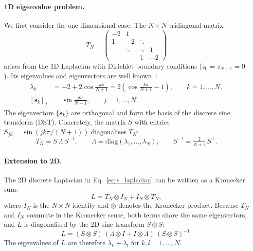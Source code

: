 \documentclass[10pt,a4paper]{article}
\begin{document}
\paragraph{1D eigenvalue problem.}
We first consider the one-dimensional case. The $N \times N$ tridiagonal matrix
\begin{equation}
  T_N =
  \begin{pmatrix}
    -2 &  1 &        &    \\
     1 & -2 & \ddots &    \\
       & \ddots & \ddots & 1 \\
       &        &  1     & -2
  \end{pmatrix}
  \label{eq:s_tridiag}
\end{equation}
arises from the 1D Laplacian with Dirichlet boundary conditions ($z_0 = z_{N+1} = 0$). Its eigenvalues and eigenvectors are well known~\cite{strang2007cse}:
\begin{align}
  \lambda_k &= -2 + 2\cos\frac{k\pi}{N+1} = 2\left(\cos\frac{k\pi}{N+1} - 1\right), \qquad k = 1,\ldots,N,
  \label{eq:s_eigenval}\\[4pt]
  [\mathbf{s}_k]_j &= \sin\frac{jk\pi}{N+1}, \qquad j = 1,\ldots,N.
  \label{eq:s_eigenvec}
\end{align}
The eigenvectors $\{\mathbf{s}_k\}$ are orthogonal and form the basis of the discrete sine transform (DST). Concretely, the matrix $S$ with entries $S_{jk} = \sin(jk\pi/(N{+}1))$ diagonalises $T_N$:
\begin{equation}
  T_N = S \,\Lambda\, S^{-1}, \qquad \Lambda = \mathrm{diag}(\lambda_1,\ldots,\lambda_N), \qquad S^{-1} = \tfrac{2}{N+1}\,S^\top.
  \label{eq:s_diag}
\end{equation}

\paragraph{Extension to 2D.}
The 2D discrete Laplacian in Eq.~\eqref{eq:s_laplacian} can be written as a Kronecker sum:
\begin{equation}
  L = T_N \otimes I_N + I_N \otimes T_N,
  \label{eq:s_kronecker}
\end{equation}
where $I_N$ is the $N \times N$ identity and $\otimes$ denotes the Kronecker product. Because $T_N$ and $I_N$ commute in the Kronecker sense, both terms share the same eigenvectors, and $L$ is diagonalised by the 2D sine transform $S \otimes S$:
\begin{equation}
  L = (S \otimes S)\,(\Lambda \otimes I + I \otimes \Lambda)\,(S \otimes S)^{-1}.
  \label{eq:s_2d_diag}
\end{equation}
The eigenvalues of $L$ are therefore $\lambda_k + \lambda_l$ for $k,l = 1,\ldots,N$.
\end{document}
